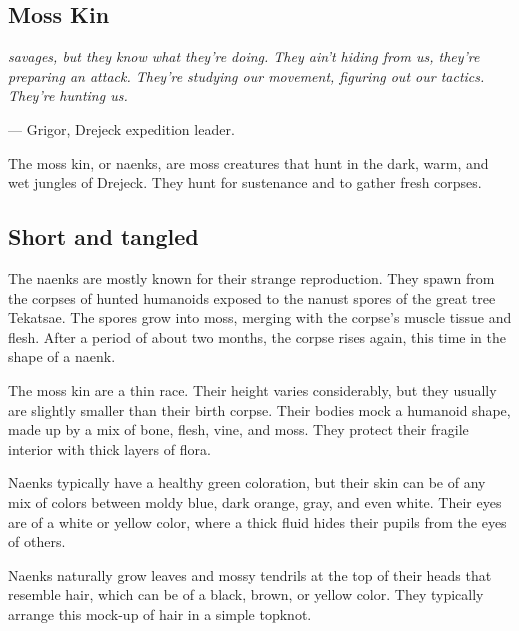\begin{linenumbers}

\section{Moss Kin}\label{src::naenk}
\textit{savages, but they know what they're doing.
They ain't hiding from us, they're preparing an attack.
They're studying our movement, figuring out our tactics.
They're hunting us.}

\hspace*{\fill} --- Grigor, Drejeck expedition leader.

The moss kin, or naenks, are moss creatures that hunt in the dark, warm, and wet jungles of Drejeck.
They hunt for sustenance and to gather fresh corpses.

\subsection*{Short and tangled}
The naenks are mostly known for their strange reproduction.
They spawn from the corpses of hunted humanoids exposed to the nanust spores of the great tree Tekatsae.
The spores grow into moss, merging with the corpse's muscle tissue and flesh.
After a period of about two months, the corpse rises again, this time in the shape of a naenk.

The moss kin are a thin race.
Their height varies considerably, but they usually are slightly smaller than their birth corpse.
Their bodies mock a humanoid shape, made up by a mix of bone, flesh, vine, and moss.
They protect their fragile interior with thick layers of flora.

Naenks typically have a healthy green coloration, but their skin can be of any mix of colors between moldy blue, dark orange, gray, and even white.
Their eyes are of a white or yellow color, where a thick fluid hides their pupils from the eyes of others.

Naenks naturally grow leaves and mossy tendrils at the top of their heads that resemble hair, which can be of a black, brown, or yellow color.
They typically arrange this mock-up of hair in a simple topknot.



\end{linenumbers}

